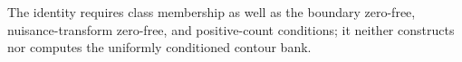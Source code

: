 The identity requires class membership as well as the boundary zero-free, nuisance-transform zero-free, and positive-count conditions; it neither constructs nor computes the uniformly conditioned contour bank.
